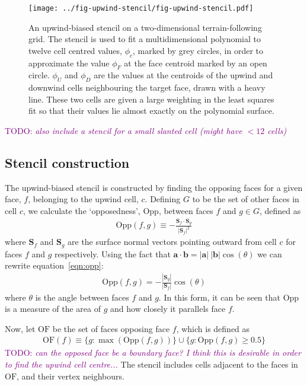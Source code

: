 \documentclass{article}
\newcommand{\TODO}[1]{\textcolor{purple}{TODO: \emph{#1}}}
\begin{document}
\begin{figure}
	\centering
	\texttt{[image: ../fig-upwind-stencil/fig-upwind-stencil.pdf]}
	\caption{An upwind-biased stencil on a two-dimensional terrain-following grid.  The stencil is used to fit a multidimensional polynomial to twelve cell centred values, $\phi_c$, marked by grey circles, in order to approximate the value $\phi_F$ at the face centroid marked by an open circle.  $\phi_U$ and $\phi_D$ are the values at the centroids of the upwind and downwind cells neighbouring the target face, drawn with a heavy line.  These two cells are given a large weighting in the least squares fit so that their values lie almost exactly on the polynomial surface.}
	\label{fig:upwind-stencil}
\end{figure}

\TODO{also include a stencil for a small slanted cell (might have $< 12$ cells)}

\subsection{Stencil construction}
The upwind-biased stencil is constructed by finding the opposing faces for a given face, $f$, belonging to the upwind cell, $c$.  Defining $G$ to be the set of other faces in cell $c$, we calculate the `opposedness', $\mathrm{Opp}$, between faces $f$ and $g \in G$, defined as
\begin{align}
	\mathrm{Opp}(f, g) \equiv - \frac{\mathbf{S}_f \cdot \mathbf{S}_g}{|\mathbf{S}_f|^2} \label{eqn:opp}
\end{align}
where $\mathbf{S}_f$ and $\mathbf{S}_g$ are the surface normal vectors pointing outward from cell $c$ for faces $f$ and $g$ respectively.
Using the fact that $\mathbf{a} \cdot \mathbf{b} = |\mathbf{a}|\:|\mathbf{b}| \cos(\theta)$ we can rewrite equation~\ref{eqn:opp}:
\begin{align}
	\mathrm{Opp}(f, g) = - \frac{|\mathbf{S}_g|}{|\mathbf{S}_f|} \cos(\theta)
\end{align}
where $\theta$ is the angle between faces $f$ and $g$.  In this form, it can be seen that $\mathrm{Opp}$ is a measure of the area of $g$ and how closely it parallels face $f$.

Now, let $\mathrm{OF}$ be the set of faces opposing face $f$, which is defined as
\begin{align}
	\mathrm{OF}(f) \equiv \{ g : \max(\mathrm{Opp}(f, g)) \} \cup \{ g : \mathrm{Opp}(f, g) \geq 0.5 \}
\end{align}
\TODO{can the opposed face be a boundary face?  I think this is desirable in order to find the upwind cell centre...}
The stencil includes cells adjacent to the faces in $\mathrm{OF}$, and their vertex neighbours.
\end{document}
